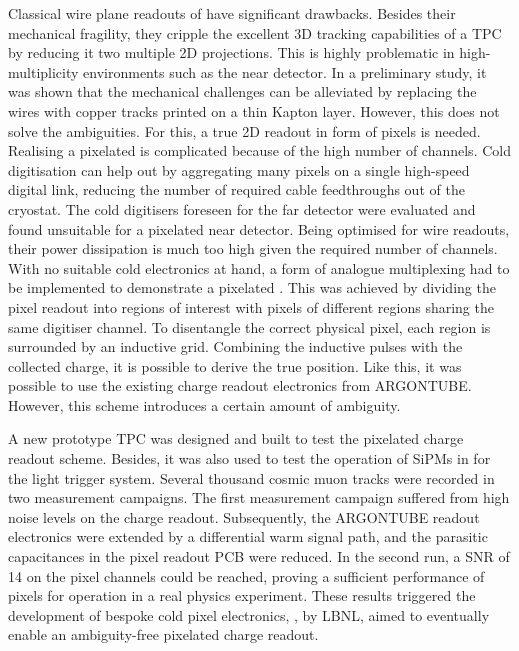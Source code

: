 Classical wire plane readouts of \lartpc{} have significant drawbacks.
Besides their mechanical fragility, they cripple the excellent 3D tracking capabilities of a TPC by reducing it two multiple 2D projections.
This is highly problematic in high-multiplicity environments such as the \dune{} near detector.
In a preliminary study, it was shown that the mechanical challenges can be alleviated by replacing the wires with copper tracks printed on a thin Kapton layer.
However, this does not solve the ambiguities.
For this, a true 2D readout in form of pixels is needed.
Realising a pixelated \lartpc{} is complicated because of the high number of channels.
Cold digitisation can help out by aggregating many pixels on a single high-speed digital link, reducing the number of required cable feedthroughs out of the cryostat.
The cold digitisers foreseen for the \dune{} far detector were evaluated and found unsuitable for a pixelated near detector.
Being optimised for wire readouts, their power dissipation is much too high given the required number of channels.
With no suitable cold electronics at hand, a form of analogue multiplexing had to be implemented to demonstrate a pixelated \lartpc{}.
This was achieved by dividing the pixel readout into regions of interest with pixels of different regions sharing the same digitiser channel.
To disentangle the correct physical pixel, each region is surrounded by an inductive grid.
Combining the inductive pulses with the collected charge, it is possible to derive the true position.
Like this, it was possible to use the existing charge readout electronics from ARGONTUBE.
However, this scheme introduces a certain amount of ambiguity.

A new prototype TPC was designed and built to test the pixelated charge readout scheme.
Besides, it was also used to test the operation of SiPMs in \lar{} for the light trigger system.
Several thousand cosmic muon tracks were recorded in two measurement campaigns.
The first measurement campaign suffered from high noise levels on the charge readout.
Subsequently, the ARGONTUBE readout electronics were extended by a differential warm signal path, and the parasitic capacitances in the pixel readout PCB were reduced.
In the second run, a SNR of \num{14} on the pixel channels could be reached, proving a sufficient performance of pixels for operation in a real physics experiment.
These results triggered the development of bespoke cold pixel electronics, \larpix{}, by LBNL, aimed to eventually enable an ambiguity-free pixelated \lartpc{} charge readout.

